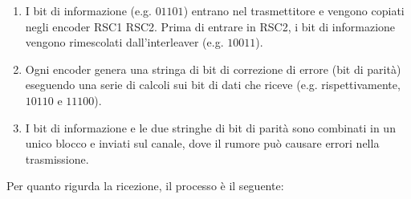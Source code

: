 \begin{center}

    \begin{figure}[h!]
        \centering
        \caption{}
       
        \label{fig:turbo_encoder}
    \end{figure}
\end{center}
\begin{enumerate}
    \item I bit di informazione (e.g. $01101$) entrano nel trasmettitore e vengono copiati negli encoder RSC1 RSC2. Prima di entrare in RSC2, i bit di informazione vengono rimescolati dall'interleaver (e.g. $10011$).
    \item Ogni encoder genera una stringa di bit di correzione di errore (bit di parità) eseguendo una serie di calcoli sui bit di dati che riceve (e.g. rispettivamente, $10110$ e $11100$).
    \item I bit di informazione e le due stringhe di bit di parità sono combinati in un unico blocco e inviati sul canale, dove il rumore può causare errori nella trasmissione.
\end{enumerate}

Per quanto rigurda la ricezione, il processo è il seguente:

